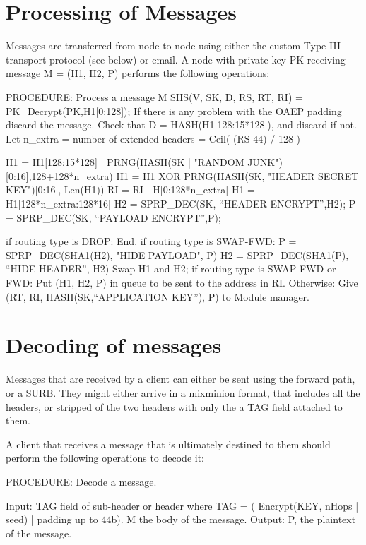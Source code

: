 \section{Processing of Messages}

Messages are transferred from node to node using either the custom Type
III transport protocol (see below) or email.  A node with private key
PK receiving message M = (H1, H2, P) performs the following operations:

PROCEDURE: Process a message M
	SHS(V, SK, D, RS, RT, RI) = PK_Decrypt(PK,H1[0:128]);
        If there is any problem with the OAEP padding discard the message.
        Check that D = HASH(H1[128:15*128]), and discard if not.
        Let n_extra = number of extended headers = Ceil( (RS-44) / 128 )
                  
        H1 = H1[128:15*128] | PRNG(HASH(SK | "RANDOM 
                                               JUNK")[0:16],128+128*n_extra)
	H1 = H1 XOR PRNG(HASH(SK, "HEADER SECRET KEY")[0:16], Len(H1))
        RI = RI | H[0:128*n_extra]
        H1 = H1[128*n_extra:128*16]
	H2 = SPRP_DEC(SK, ``HEADER ENCRYPT'',H2);
	P = SPRP_DEC(SK, ``PAYLOAD ENCRYPT'',P);

	if routing type is DROP:
                End.
	if routing type is SWAP-FWD:
                P = SPRP_DEC(SHA1(H2), "HIDE PAYLOAD", P)
		H2 = SPRP_DEC(SHA1(P), ``HIDE HEADER'', H2)
		Swap H1 and H2;
        if routing type is SWAP-FWD or FWD:
	   	Put (H1, H2, P) in queue to be sent to the address in RI.
        Otherwise:
		Give (RT, RI, HASH(SK,``APPLICATION KEY''), P) to
Module manager. 

\section{Decoding of messages}

Messages that are received by a client can either be sent using the
forward path, or a SURB. They might either arrive in a mixminion
format, that includes all the headers, or stripped of the two headers
with only the a TAG field attached to them.

A client that receives a message that is ultimately destined to them
should perform the following operations to decode it:

PROCEDURE: Decode a message.

Input:  TAG field of sub-header or header where 
        TAG = ( Encrypt(KEY, nHops | seed) | padding up to 44b).
        M the body of the message.
Output: P, the plaintext of the message.

